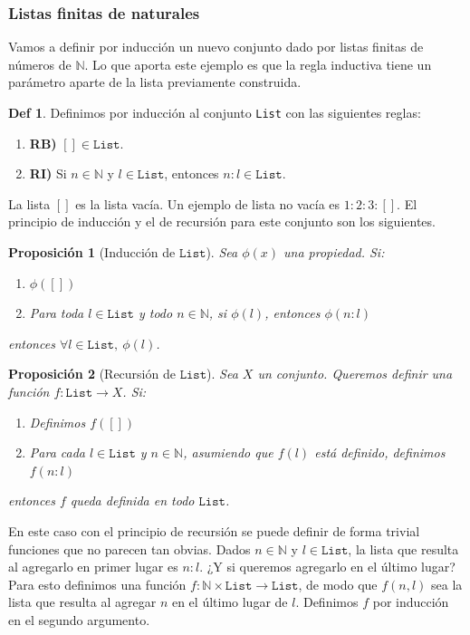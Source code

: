 \documentclass[a4paper, 12pt]{report}
\newcommand{\N}{\mathbb{N}}
\newtheorem*{prop*}{Proposición}
\theoremstyle{definition}
\newtheorem*{definicion*}{Def}
\begin{document}
\subsubsection{Listas finitas de naturales}

Vamos a definir por inducción un nuevo conjunto dado por listas finitas de números de $\N$. Lo que aporta este ejemplo es que la regla inductiva tiene un parámetro aparte de la lista previamente construida.

\begin{definicion*}
	Definimos por inducción al conjunto \texttt{List} con las siguientes reglas:
	\begin{enumerate}
		\item \textbf{RB)} $[]\in\mathtt{List}$.
		\item \textbf{RI)} Si $n\in\N$ y $l\in\mathtt{List}$, entonces $n:l\in\mathtt{List}$.
	\end{enumerate}
\end{definicion*}
La lista $[]$ es la lista vacía. Un ejemplo de lista no vacía es $1:2:3:[]$. El principio de inducción y el de recursión para este  conjunto son los siguientes.
\begin{prop*}[Inducción de $\mathtt{List}$]
	
	Sea $\phi(x)$ una propiedad. Si:
	\begin{enumerate}
		\item $\phi([])$
		\item Para toda $l\in\mathtt{List}$ y todo $n\in\N$, si $\phi(l)$, entonces $\phi(n:l)$
	\end{enumerate}
	entonces $\forall l\in\mathtt{List},~\phi(l)$.
\end{prop*}
\begin{prop*}[Recursión de $\mathtt{List}$]
	Sea $X$ un conjunto. Queremos definir una función $f:\mathtt{List}\to X$. Si:
	\begin{enumerate}
		\item Definimos $f([])$
		\item Para cada $l\in\mathtt{List}$ y $n\in\N$, asumiendo que $f(l)$ está definido, definimos $f(n:l)$
	\end{enumerate}
	entonces $f$ queda definida en todo $\mathtt{List}$.
\end{prop*}
En este caso con el principio de recursión se puede definir de forma trivial funciones que no parecen tan obvias. Dados $n\in\N$ y $l\in\mathtt{List}$, la lista que resulta al agregarlo en primer lugar es $n:l$. ¿Y si queremos agregarlo en el último lugar? Para esto definimos una función $f:\N\times\mathtt{List}\to\mathtt{List}$, de modo que $f(n,l)$ sea la lista que resulta al agregar $n$ en el último lugar de $l$. Definimos $f$ por inducción en el segundo argumento.
\end{document}
